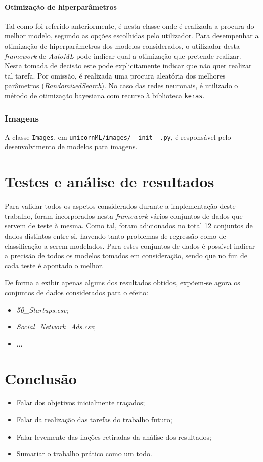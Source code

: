 \documentclass[a4paper]{report}
\begin{document}
{			\subsubsection{Otimização de hiperparâmetros} \label{sssec:Optimization}
			Tal como foi referido anteriormente, é nesta classe onde é realizada a procura do melhor modelo, segundo as opções escolhidas pelo utilizador.
			Para desempenhar a otimização de hiperparâmetros dos modelos considerados, o utilizador desta \textit{framework} de \textit{AutoML} pode indicar qual a otimização que pretende realizar.
			Nesta tomada de decisão este pode explicitamente indicar que não quer realizar tal tarefa. Por omissão, é realizada uma procura aleatória dos melhores parâmetros (\textit{RandomizedSearch}).
			No caso das redes neuronais, é utilizado o método de otimização bayesiana com recurso à biblioteca \texttt{keras}.


		\subsection{Imagens}
		A classe \texttt{Images}, em \texttt{unicornML/images/\_\_init\_\_.py}, é responsável pelo desenvolvimento de modelos para imagens.
}

\chapter{Testes e análise de resultados} \label{ch:Test&Analysis}
\large{
	Para validar todos os aspetos considerados durante a implementação deste trabalho, foram incorporados nesta \textit{framework} vários conjuntos de dados que servem de teste à mesma.
	Como tal, foram adicionados no total 12 conjuntos de dados distintos entre si, havendo tanto problemas de regressão como de classificação a serem modelados.
	Para estes conjuntos de dados é possível indicar a precisão de todos os modelos tomados em consideração, sendo que no fim de cada teste é apontado o melhor.

	De forma a exibir apenas alguns dos resultados obtidos, expõem-se agora os conjuntos de dados considerados para o efeito:
	\begin{itemize}
		\item \textsl{50\_Startups.csv};
		\item \textsl{Social\_Network\_Ads.csv};
		\item ...
	\end{itemize}
}

\chapter{Conclusão} \label{ch:Conclusion}
\large{
	\begin{itemize}
		\item Falar dos objetivos inicialmente traçados;
		\item Falar da realização das tarefas do trabalho futuro;
		\item Falar levemente das ilações retiradas da análise dos resultados;
		\item Sumariar o trabalho prático como um todo.
	\end{itemize}
}
\end{document}
